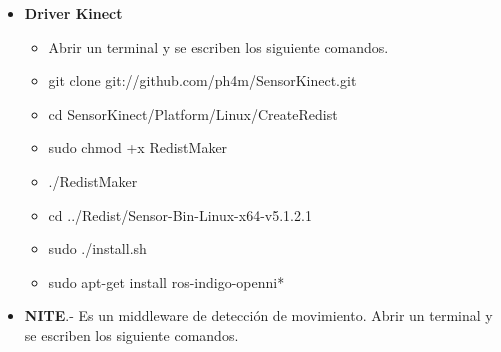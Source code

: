 \documentclass[12pt,a4paper]{article}
\begin{document}
\begin{itemize}
\item \textbf{Driver Kinect}
\begin{itemize}
\item Abrir un terminal y se escriben los siguiente comandos.
\item  git clone git://github.com/ph4m/SensorKinect.git
\item  cd SensorKinect/Platform/Linux/CreateRedist
\item  sudo chmod +x RedistMaker
\item  ./RedistMaker
\item  cd ../Redist/Sensor-Bin-Linux-x64-v5.1.2.1
\item  sudo ./install.sh
\item  sudo apt-get install ros-indigo-openni*
\end{itemize}

\item \textbf{NITE}.- Es un middleware de detección de movimiento.
Abrir un terminal y se escriben los siguiente comandos.
\begin{itemize}


\end{itemize}
\end{itemize}
\end{document}

